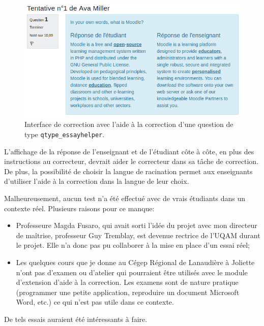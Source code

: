 \begin{figure}[htbp]
  \includegraphics[scale=0.85]{images/questionform_correction.png}
  \caption{Interface de correction avec l'aide \`a la correction d'une question de type \texttt{qtype\_essayhelper}.}
  \label{questionform_correction}
\end{figure}

L'affichage de la r\'eponse de l'enseignant et de l'\'etudiant c\^ote \`a c\^ote, en plus des instructions au correcteur, devrait aider le correcteur dans sa t\^ache de correction.
De plus, la possibilit\'e de choisir la langue de racination permet aux enseignants d'utiliser l'aide \`a la correction dans la langue de leur choix.

Malheureusement, aucun test n'a \'et\'e effectu\'e avec de vrais \'etudiants dans un contexte r\'eel.
Plusieurs raisons pour ce manque:
\begin{itemize}
  \item Professeure Magda Fusaro, qui avait sorti l'id\'ee du projet avec mon directeur de ma\^itrise, professeur Guy Tremblay, est devenue rectrice de l'UQAM durant le projet. Elle n'a donc pas pu collaborer \`a la mise en place d'un essai r\'eel;
  \item Les quelques cours que je donne au C\'egep R\'egional de Lanaudi\`ere \`a Joliette n'ont pas d'examen ou d'atelier qui pourraient \^etre utilis\'es avec le module d'extension d'aide \`a la correction.
    Les examens sont de nature pratique (programmer une petite application, reproduire un document Microsoft Word, etc.) ce qui n'est pas utile dans ce contexte.
\end{itemize}
De tels essais auraient \'et\'e int\'eressants \`a faire.

